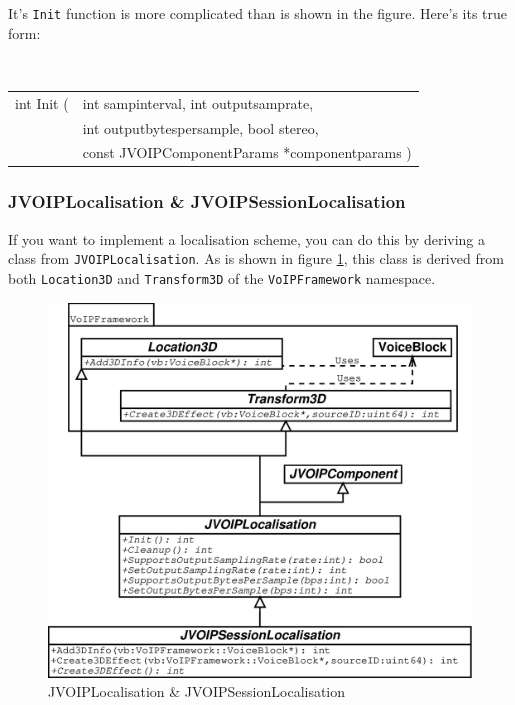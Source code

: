 			It's {\tt Init} function is more complicated than is shown in the
			figure. Here's its true form:
			\begin{center}
				{\tt
				\begin{tabular}{rl}
					int Init (&int sampinterval, int outputsamprate,\\
					&int outputbytespersample, bool stereo,\\
					&const JVOIPComponentParams *componentparams )\\
				\end{tabular}
				}
			\end{center}
			
			\subsubsection{JVOIPLocalisation \& JVOIPSessionLocalisation}
			
			If you want to implement a localisation scheme, you can do this by
			deriving a class from {\tt JVOIPLocalisation}. As is shown in figure
			\ref{class-jvoiplocalisation}, this class is derived from both
			{\tt Location3D} and {\tt Transform3D} of the {\tt VoIPFramework}
			namespace.
			\begin{figure}
				\center
				\includegraphics[width=\linewidth]{images/manual/chapter2/class-jvoiplocalisation.eps}
				\caption{JVOIPLocalisation \& JVOIPSessionLocalisation}
				\label{class-jvoiplocalisation}
			\end{figure}
			
